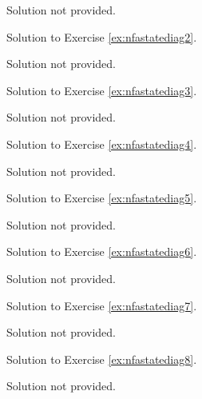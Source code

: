 
    Solution not provided.
    

\newpage

Solution to Exercise \ref{ex:nfastatediag2}.


    Solution not provided.
    

\newpage

Solution to Exercise \ref{ex:nfastatediag3}.


    Solution not provided.
    

\newpage

Solution to Exercise \ref{ex:nfastatediag4}.


    Solution not provided.
    

\newpage

Solution to Exercise \ref{ex:nfastatediag5}.


    Solution not provided.
    

\newpage

Solution to Exercise \ref{ex:nfastatediag6}.


    Solution not provided.
    

\newpage

Solution to Exercise \ref{ex:nfastatediag7}.


    Solution not provided.
    

\newpage

Solution to Exercise \ref{ex:nfastatediag8}.


    Solution not provided.
    

\newpage

